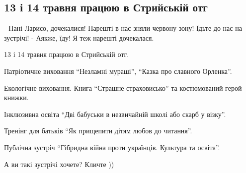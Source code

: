  
 
 
 
 

\subsection{13 і 14 травня працюю в Стрийській отг}
\label{sec:12_05_2021.fb.nicoi_larysa.1.deti}

- Пані Ларисо, дочекалися! Нарешті в нас зняли червону зону! Їдьте до нас на зустрічі!
- Аякже, їду! Я теж нарешті дочекалася. 

13 і 14 травня працюю в Стрийській отг. 

Патріотичне виховання \enquote{Незламні мураші}, \enquote{Казка про славного Орленка}.

Екологічне виховання. Книга  \enquote{Страшне страховисько} та костюмований герой книжки.

Інклюзивна освіта \enquote{Дві бабуськи в незвичайній школі або скарб у візку}. 

Тренінг для батьків \enquote{Як прищепити дітям любов до читання}.

Публічна зустріч \enquote{Гібридна війна проти українців. Культура та освіта}. 

А ви такі зустрічі хочете? Кличте ))
